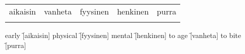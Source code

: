 \begin{center}
  \begin{tabular}{|c c c c c|}
    \hline
    aikaisin & vanheta & fyysinen & henkinen & purra \\
    &&&&\\
    \hline
  \end{tabular}
\end{center}

\begin{questions}
  \begin{multicols}{3}
    \raggedcolumns
    \question early \f[aikaisin]
    \question physical \f[fyysinen]
    \question mental \f[henkinen]
    \question to age \f[vanheta]
    \question to bite \f[purra]
  \end{multicols}
\end{questions}
